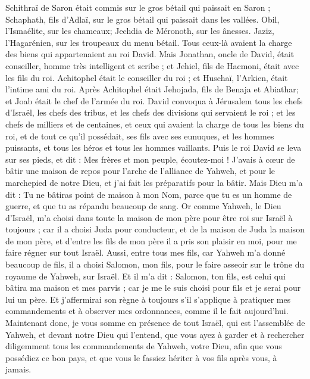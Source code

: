 \begin{multicols}{2}
Schithraï de Saron était commis sur le gros bétail qui paissait en Saron ; Schaphath, fils d'Adlaï, sur le gros bétail qui paissait dans les vallées.
Obil, l'Ismaélite, sur les chameaux; Jechdia de Méronoth, sur les ânesses.
Jaziz, l'Hagarénien, sur les troupeaux du menu bétail. Tous ceux-là avaient la charge des biens qui appartenaient au roi David.
Mais Jonathan, oncle de David, était conseiller, homme très intelligent et scribe ; et Jehiel, fils de Hacmoni, était avec les fils du roi.
Achitophel était le conseiller du roi ; et Huschaï, l'Arkien, était l'intime ami du roi.
Après Achitophel était Jehojada, fils de Benaja et Abiathar; et Joab était le chef de l'armée du roi.
\VerseOne{}David convoqua à Jérusalem tous les chefs d'Israël, les chefs des tribus, et les chefs des divisions qui servaient le roi ; et les chefs de milliers et de centaines, et ceux qui avaient la charge de tous les biens du roi, et de tout ce qu'il possédait, ses fils avec ses eunuques, et les hommes puissants, et tous les héros et tous les hommes vaillants.
Puis le roi David se leva sur ses pieds, et dit : Mes frères et mon peuple, écoutez-moi ! J'avais à cœur de bâtir une maison de repos pour l'arche de l'alliance de Yahweh, et pour le marchepied de notre Dieu, et j'ai fait les préparatifs pour la bâtir.
Mais Dieu m'a dit : Tu ne bâtiras point de maison à mon Nom, parce que tu es un homme de guerre, et que tu as répandu beaucoup de sang.
Or comme Yahweh, le Dieu d'Israël, m'a choisi dans toute la maison de mon père pour être roi sur Israël à toujours ; car il a choisi Juda pour conducteur, et de la maison de Juda la maison de mon père, et d'entre les fils de mon père il a pris son plaisir en moi, pour me faire régner sur tout Israël.
Aussi, entre tous mes fils, car Yahweh m'a donné beaucoup de fils, il a choisi Salomon, mon fils, pour le faire asseoir sur le trône du royaume de Yahweh, sur Israël.
Et il m'a dit : Salomon, ton fils, est celui qui bâtira ma maison et mes parvis ; car je me le suis choisi pour fils et je serai pour lui un père.
Et j'affermirai son règne à toujours s'il s'applique à pratiquer mes commandements et à observer mes ordonnances, comme il le fait aujourd'hui.
Maintenant donc, je vous somme en présence de tout Israël, qui est l'assemblée de Yahweh, et devant notre Dieu qui l'entend, que vous ayez à garder et à rechercher diligemment tous les commandements de Yahweh, votre Dieu, afin que vous possédiez ce bon pays, et que vous le fassiez hériter à vos fils après vous, à jamais.

\end{multicols}
